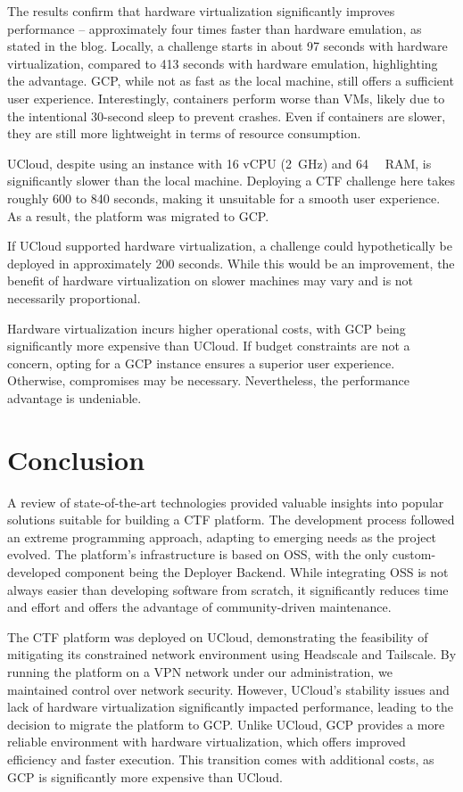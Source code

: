 The results confirm that hardware virtualization significantly improves performance -- approximately four times faster than hardware emulation, as stated in the blog. Locally, a challenge starts in about 97 seconds with hardware virtualization, compared to 413 seconds with hardware emulation, highlighting the advantage. GCP, while not as fast as the local machine, still offers a sufficient user experience. Interestingly, containers perform worse than VMs, likely due to the intentional 30-second sleep to prevent crashes. Even if containers are slower, they are still more lightweight in terms of resource consumption.

UCloud, despite using an instance with 16 vCPU (\SI{2}{\giga\hertz}) and \SI{64}{\giga\byte} RAM, is significantly slower than the local machine. Deploying a CTF challenge here takes roughly 600 to 840 seconds, making it unsuitable for a smooth user experience. As a result, the platform was migrated to GCP.

If UCloud supported hardware virtualization, a challenge could hypothetically be deployed in approximately 200 seconds. While this would be an improvement, the benefit of hardware virtualization on slower machines may vary and is not necessarily proportional.

Hardware virtualization incurs higher operational costs, with GCP being significantly more expensive than UCloud. If budget constraints are not a concern, opting for a GCP instance ensures a superior user experience. Otherwise, compromises may be necessary. Nevertheless, the performance advantage is undeniable.

\chapter{Conclusion}
A review of state-of-the-art technologies provided valuable insights into popular solutions suitable for building a CTF platform. The development process followed an extreme programming approach, adapting to emerging needs as the project evolved. The platform's infrastructure is based on OSS, with the only custom-developed component being the Deployer Backend. While integrating OSS is not always easier than developing software from scratch, it significantly reduces time and effort and offers the advantage of community-driven maintenance.

The CTF platform was deployed on UCloud, demonstrating the feasibility of mitigating its constrained network environment using Headscale and Tailscale. By running the platform on a VPN network under our administration, we maintained control over network security. However, UCloud's stability issues and lack of hardware virtualization significantly impacted performance, leading to the decision to migrate the platform to GCP. Unlike UCloud, GCP provides a more reliable environment with hardware virtualization, which offers improved efficiency and faster execution. This transition comes with additional costs, as GCP is significantly more expensive than UCloud.

